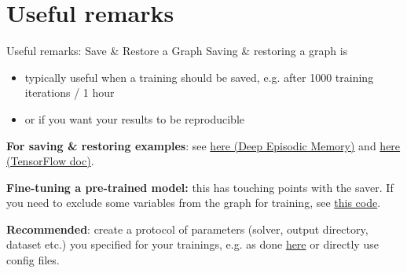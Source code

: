 \documentclass[18pt]{beamer}
\begin{document}
\section{Useful remarks}
\begin{frame}{Useful remarks: Save \& Restore a Graph}
Saving \& restoring a graph is
\begin{itemize}
\item typically useful when a training should be saved, e.g. after 1000 training iterations / 1 hour
\item or if you want your results to be reproducible
\end{itemize}

\textbf{For saving \& restoring examples}: see \textcolor{kitgreen}{ \href{https://github.com/jonasrothfuss/DeepEpisodicMemory/blob/master/train_model.py\#L320}{here (Deep Episodic Memory)}} and \textcolor{kitgreen}{ \href{https://www.tensorflow.org/programmers_guide/saved_model}{here (TensorFlow doc)}}.

\textbf{Fine-tuning a pre-trained model:} this has touching points with the saver. If you need to exclude some variables from the graph for training,  see \textcolor{kitgreen}{ \href{https://github.com/jonasrothfuss/DeepEpisodicMemory/blob/master/train_model.py\#L249}{this code}}.

\textbf{Recommended}: create a protocol of parameters (solver, output directory, dataset etc.) you specified for your trainings, e.g. as done \textcolor{kitgreen}{ \href{https://github.com/jonasrothfuss/DeepEpisodicMemory/blob/master/utils/io_handler.py\#L201}{here}} or directly use config files.
\end{frame}
\end{document}

